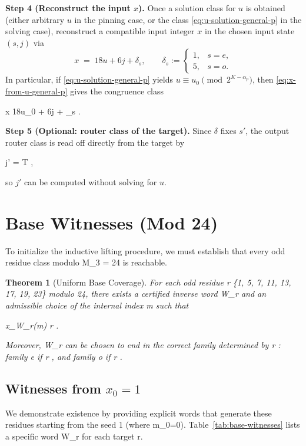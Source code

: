 \documentclass[11pt,letterpaper]{amsart}
\def\mathrm#1{#1}%
\def\({}%
\def\){}%
\def\[{ }%
\def\]{ }%
\theoremstyle{definition}
\theoremstyle{plain}
\newtheorem{theorem}{Theorem}
\theoremstyle{plain}
\theoremstyle{remark}
\begin{document}
\smallskip
\noindent\textbf{Step 4 (Reconstruct the input $x$).}
Once a solution class for $u$ is obtained (either arbitrary $u$ in the pinning case, or the class \eqref{eq:u-solution-general-p} in the solving case), reconstruct a compatible input integer $x$ in the chosen input state $(s,j)$ via
\begin{equation}\label{eq:x-from-u-general-p}
x \;=\; 18u + 6j + \delta_s,
\qquad
\delta_s :=
\begin{cases}
1,& s=e,\\
5,& s=o.
\end{cases}
\end{equation}
In particular, if \eqref{eq:u-solution-general-p} yields $u\equiv u_0 \pmod{2^{K-\alpha_p}}$, then \eqref{eq:x-from-u-general-p} gives the congruence class
\[
x \equiv 18u_0 + 6j + \delta_s .
\]

\smallskip
\noindent\textbf{Step 5 (Optional: router class of the target).}
Since $\delta$ fixes $s'$, the output router class is read off directly from the target by
\[
j' \equiv \left\lfloor{}\right\rfloor \equiv \frac{x_{\mathrm{tar}}-\delta}{6} = T ,
\]
so $j'$ can be computed without solving for $u$.

\section{Base Witnesses (Mod 24)}
\label{sec:base-witnesses}

To initialize the inductive lifting procedure, we must establish that every odd residue class modulo \(M_3 = 24\) is reachable.

\begin{theorem}[Uniform Base Coverage]
\label{thm:base-coverage}
For each odd residue \(r \in \{1, 5, 7, 11, 13, 17, 19, 23\}\) modulo \(24\), there exists a certified inverse word \(W_r\) and an admissible choice of the internal index \(m\) such that
\[
x_{W_r}(m) \equiv r .
\]
Moreover, \(W_r\) can be chosen to end in the correct family determined by \(r \): family \(\mathrm{e}\) if \(r  \), and family \(\mathrm{o}\) if \(r  \).
\end{theorem}

\subsection{Witnesses from \texorpdfstring{$x_0=1$}{x0=1}}
We demonstrate existence by providing explicit words that generate these residues starting from the seed \(1\) (where \(m_0=0\)). Table~\ref{tab:base-witnesses} lists a specific word \(W_r\) for each target \(r\).
\end{document}
